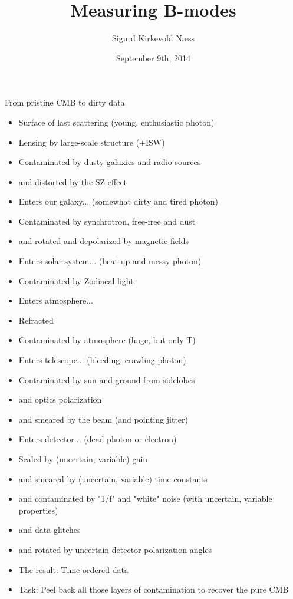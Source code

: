 \documentclass{beamer}
\title{Measuring B-modes}
\author{Sigurd Kirkevold Næss}
\institute{Subdepartment of astrophysics, Oxford University}
\date{September 9th, 2014}
\begin{document}
\begin{frame}
	\titlepage
\end{frame}

\begin{frame}{From pristine CMB to dirty data}
	\begin{itemize}
		\item Surface of last scattering (young, enthusiastic photon)
		\item Lensing by large-scale structure (+ISW)
		\item Contaminated by dusty galaxies and radio sources
		\item and distorted by the SZ effect
		\item Enters our galaxy... (somewhat dirty and tired photon)
		\item Contaminated by synchrotron, free-free and dust
		\item and rotated and depolarized by magnetic fields
		\item Enters solar system... (beat-up and messy photon)
		\item Contaminated by Zodiacal light
		\item Enters atmosphere...
		\item Refracted
		\item Contaminated by atmosphere (huge, but only T)
		\item Enters telescope... (bleeding, crawling photon)
		\item Contaminated by sun and ground from sidelobes
		\item and optics polarization
		\item and smeared by the beam (and pointing jitter)
		\item Enters detector... (dead photon or electron)
		\item Scaled by (uncertain, variable) gain
		\item and smeared by (uncertain, variable) time constants
		\item and contaminated by "1/f" and "white" noise (with uncertain, variable properties)
		\item and data glitches
		\item and rotated by uncertain detector polarization angles
		\item The result: Time-ordered data
		\item Task: Peel back all those layers of contamination to recover the pure CMB
	\end{itemize}
\end{frame}
\end{document}
